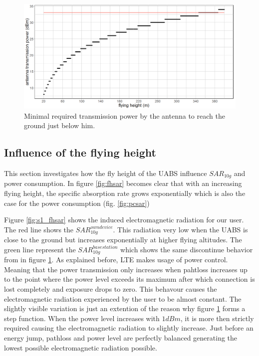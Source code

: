 \begin{figure}[h!]
  \includegraphics[width=\textwidth]{../results/s1/ptx-fh2.png}
  \caption{Minimal required transmission power by the antenna to reach the ground just below him.}
  \label{fig:ptxfh}
\end{figure}

\subsection{Influence of the flying height}
\label{sub:senario1_influenceOfFlyHeight}

This section investigates how the fly height of the \gls{UABS} influence $SAR_{10g}$ and power consumption. In figure \ref{fig:fhsar}
becomes clear that with an increasing flying height, the specific absorption rate grows exponentially 
which is also the case for the power consumption (fig. \ref{fig:pcsar})  

Figure \ref{fig:s1_fhsar} shows the induced electromagnetic radiation for our user. The red line shows the $SAR^{own device}_{10g}$. This radiation very low when the \gls{UABS}
is close to the ground but increases exponentially at higher flying altitudes. The green line represent the $SAR^{basestation}_{10g}$ which shows the same discontinue 
behavior from in figure \ref{fig:ptxfh}. As explained before, \gls{LTE} makes usage of power control. Meaning that the power transmission only increases when pahtloss 
increases up to the point where the power level exceeds its maximum after which connection is lost completely and exposure drops to zero. 
This behavour causes the electromagnetic radiation experienced by the user to be almost constant. The slightly visible variation is just an extention of the reason 
why figure \ref{fig:ptxfh} forms a step function. When the power level increases with $1 dBm$, it is more then strictly required causing the electromagnetic radiation to 
slightly increase. Just before an energy jump, pathloss and power level are perfectly balanced generating the lowest possible electromagnetic radiation possible.

